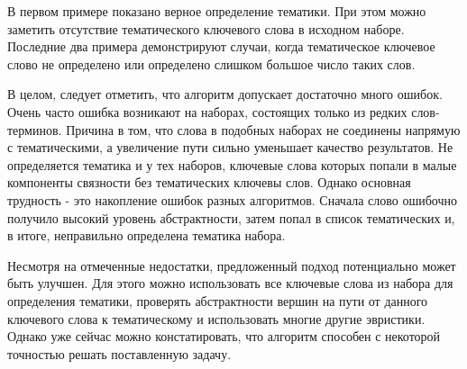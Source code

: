 В первом примере показано верное определение тематики. При этом можно заметить отсутствие тематического ключевого слова в исходном наборе. Последние два примера демонстрируют случаи, когда тематическое ключевое слово не определено или определено слишком большое число таких слов.

В целом, следует отметить, что алгоритм допускает достаточно много ошибок. Очень часто ошибка возникают на наборах, состоящих только из редких слов-терминов. Причина в том, что слова в подобных наборах не соединены напрямую с тематическими, а увеличение пути сильно уменьшает качество результатов. Не определяется тематика и у тех наборов, ключевые слова которых попали в малые компоненты связности без тематических ключевы слов. Однако основная трудность - это накопление ошибок разных алгоритмов. Сначала слово ошибочно получило высокий уровень абстрактности, затем попал в список тематических и, в итоге, неправильно определена тематика набора.

Несмотря на отмеченные недостатки, предложенный подход потенциально может быть улучшен. Для этого можно использовать все ключевые слова из набора для определения тематики, проверять абстрактности вершин на пути от данного ключевого слова к тематическому и использовать многие другие эвристики. Однако уже сейчас можно констатировать, что алгоритм способен с некоторой точностью решать поставленную задачу. 



